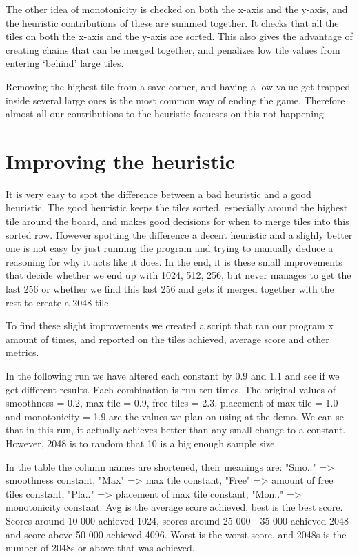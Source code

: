 The other idea of monotonicity is checked on both the x-axis and the y-axis, and
the heuristic contributions of these are summed together. It checks that all the tiles
on both the x-axis and the y-axis are sorted. This also gives the advantage of
creating chains that can be merged together, and penalizes low tile values from
entering `behind' large tiles.

Removing the highest tile from a save corner, and having a low value get trapped
inside several large ones is the most common way of ending the game. Therefore
almost all our contributions to the heuristic focueses on this not happening.

\section{Improving the heuristic}

It is very easy to spot the difference between a bad heuristic and a good heuristic.
The good heuristic keeps the tiles sorted, especially around the highest tile around
the board, and makes good decisions for when to merge tiles into this sorted row.
However spotting the difference a decent heuristic and a slighly better one is not
easy by just running the program and trying to manually deduce a reasoning for why
it acts like it does. In the end, it is these small improvements that decide whether
we end up with 1024, 512, 256, but never manages to get the last 256 or whether
we find this last 256 and gets it merged together with the rest to create a 2048 tile.

To find these slight improvements we created a script that ran our program x amount of
times, and reported on the tiles achieved, average score and other metrics.

In the following run we have altered each constant by 0.9 and 1.1 and see if we
get different results. Each combination is run ten times. The original values
of smoothness = 0.2, max tile = 0.9, free tiles = 2.3, placement of max tile = 1.0
and monotonicity = 1.9 are the values we plan on using at the demo. We can se
that in this run, it actually achieves better than any small change to a constant.
However, 2048 is to random that 10 is a big enough sample size.

In the table the column names are shortened, their meanings are: "Smo.." => smoothness
constant, "Max" => max tile constant, "Free" => amount of free tiles constant,
"Pla.." => placement of max tile constant, "Mon.." => monotonicity constant. Avg is the
average score achieved, best is the best score. Scores around 10 000 achieved 1024,
scores around 25 000 - 35 000 achieved 2048 and score above 50 000 achieved 4096.
Worst is the worst score, and 2048s is the number of 2048s or above that was achieved.


